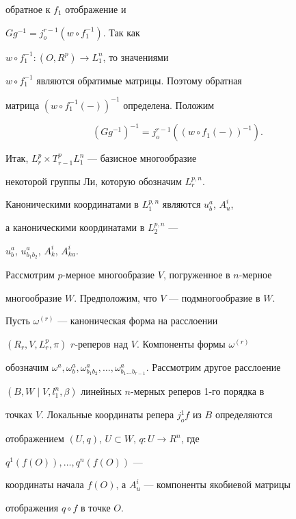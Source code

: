 обратное к $f_1$ отображение и


$Gg^{-1} = j^{r-1}_o (w \circ f^{-1}_1)$. Так как


$w \circ f^{-1}_1 : (O,R^p) \to L^n_1$, то значениями


$w \circ f^{-1}_1$ являются обратимые матрицы. Поэтому обратная


матрица $(w \circ f^{-1}_1(-))^{-1}$ определена. Положим


$$


(Gg^{-1})^{-1} = j^{r-1}_o ((w \circ f_1 (-))^{-1}).


$$


Итак, $L^p_r \times T^p_{r-1} L^n_1$ --- базисное многообразие


некоторой группы Ли, которую обозначим $L^{p,n}_r$.





Каноническими координатами в $L^{p,n}_1$ являются $u^a_b$, $A^i_u$,


а каноническими координатами в $L^{p,n}_2$ ---


$u^a_b$, $u^a_{b_1 b_2}$, $A^i_k$, $A^i_{ka}$.





Рассмотрим $p$-мерное многообразие $V$, погруженное в $n$-мерное


многообразие $W$. Предположим, что $V$ --- подмногообразие в $W$.


Пусть $\omega^{(r)}$ --- каноническая форма на расслоении


$(R_r,V,L^p_r,\pi)$ $r$-реперов над $V$. Компоненты формы $\omega^{(r)}$


обозначим $\omega^a, \omega^a_b, \omega^a_{b_1 b_2}, \dots,


\omega^a_{b_1\dotsc b_{r-1}}$. Рассмотрим другое расслоение


$(B, W \mid V, l^n_1, \beta)$ линейных $n$-мерных реперов 1-го порядка в


точках $V$. Локальные координаты репера $j^1_o f$ из $B$ определяются


отображением $(U,q)$, $U \subset W$, $q: U \to R^n$, где


$q^1 (f(O)),\dotsc,q^n (f(O))$ ---


координаты начала $f(O)$, а $A^i_u$ --- компоненты якобиевой матрицы


отображения $q \circ f$ в точке $O$.





